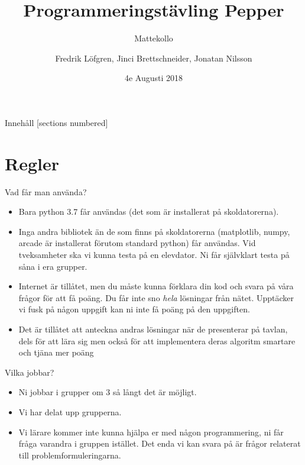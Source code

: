 \documentclass[10pt]{beamer}
\title{Programmeringstävling Pepper}
\subtitle{Mattekollo}
\date{4e Augusti 2018}
\author{Fredrik Löfgren, Jinci Brettschneider, Jonatan Nilsson}
\begin{document}
\maketitle

\begin{frame}{Innehåll}
  [sections numbered]
  \tableofcontents[hideallsubsections]
\end{frame}


\section{Regler}

\begin{frame}[fragile]{Vad får man använda?}

\begin{itemize}
\item Bara python 3.7 får användas (det som är installerat på skoldatorerna).
\item Inga andra bibliotek än de som finns på skoldatorerna (matplotlib, numpy, arcade är installerat förutom standard python) får användas. Vid tveksamheter ska vi kunna testa på en elevdator. Ni får självklart testa på såna i era grupper. 
\item Internet är tillåtet, men du måste kunna förklara din kod och svara på våra frågor för att få poäng. Du får inte sno \emph{hela} lösningar från nätet. Upptäcker vi fusk på någon uppgift kan ni inte få poäng på den uppgiften. 
\item Det är tillåtet att anteckna andras lösningar när de presenterar på tavlan, dels för att lära sig men också för att implementera deras algoritm smartare och tjäna mer poäng
\end{itemize}
\end{frame}

\begin{frame}[fragile]{Vilka jobbar?}

\begin{itemize}
\item Ni jobbar i grupper om 3 så långt det är möjligt. 
\item Vi har delat upp grupperna. 
\item Vi lärare kommer inte kunna hjälpa er med någon programmering, ni får fråga varandra i gruppen istället. Det enda vi kan svara på är frågor relaterat till problemformuleringarna. 
\end{itemize}
\end{frame}
\end{document}
